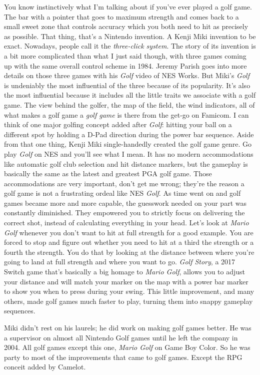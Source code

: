 \documentclass{book}
\begin{document}
You know instinctively what I’m talking about if you’ve ever played a golf game. The bar with a pointer that goes to maximum strength and comes back to a small sweet zone that controls accuracy which you both need to hit as precisely as possible. That thing, that’s a Nintendo invention. A Kenji Miki invention to be exact. Nowadays, people call it the \emph{three-click system}. The story of its invention is a bit more complicated than what I just said though, with three games coming up with the same overall control scheme in 1984. Jeremy Parish goes into more details on those three games with his \emph{Golf} video of NES Works. But Miki’s \emph{Golf} is undeniably the most influential of the three because of its popularity. It’s also the most influential because it includes all the little traits we associate with a golf game. The view behind the golfer, the map of the field, the wind indicators, all of what makes a golf game a \emph{golf game} is there from the get-go on Famicom. I can think of one major golfing concept added after \emph{Golf}: hitting your ball on a different spot by holding a D-Pad direction during the power bar sequence. Aside from that one thing, Kenji Miki single-handedly created the golf game genre. Go play \emph{Golf} on NES and you’ll see what I mean. It has no modern accommodations like automatic golf club selection and hit distance markers, but the gameplay is basically the same as the latest and greatest PGA golf game. Those accommodations are very important, don’t get me wrong; they’re the reason a golf game is not a frustrating ordeal like NES \emph{Golf}. As time went on and golf games became more and more capable, the guesswork needed on your part was constantly diminished. They empowered you to strictly focus on delivering the correct shot, instead of calculating everything in your head. Let’s look at \emph{Mario Golf} whenever you don’t want to hit at full strength for a good example. You are forced to stop and figure out whether you need to hit at a third the strength or a fourth the strength. You do that by looking at the distance between where you’re going to land at full strength and where you want to go. \emph{Golf Story}, a 2017 Switch game that’s basically a big homage to \emph{Mario Golf}, allows you to adjust your distance and will match your marker on the map with a power bar marker to show you when to press during your swing. This little improvement, and many others, made golf games much faster to play, turning them into snappy gameplay sequences.\par
Miki didn’t rest on his laurels; he did work on making golf games better. He was a supervisor on almost all Nintendo Golf games until he left the company in 2004. All golf games except this one, \emph{Mario Golf} on Game Boy Color. So he was party to most of the improvements that came to golf games. Except the RPG conceit added by Camelot.\par
\end{document}

